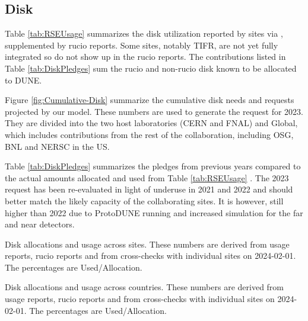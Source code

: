 \documentclass[12pt]{article}
\begin{document}
\subsection{Disk}
Table \ref{tab:RSEUsage} summarizes the disk utilization reported by sites via \cite{scotgrid}, supplemented by  rucio reports.   Some sites, notably TIFR, are not yet fully integrated so do not show up in the rucio reports.  The contributions listed in Table \ref{tab:DiskPledges} sum the rucio and non-rucio disk known to be allocated to DUNE.

Figure \ref{fig:Cumulative-Disk}  summarize the cumulative disk needs and requests projected by our model. These numbers are used to generate the request for 2023.  They are divided into the two host laboratories (CERN and FNAL) and Global, which includes contributions from the rest of the collaboration, including OSG, BNL and NERSC in the US. 

Table \ref{tab:DiskPledges} summarizes the pledges from previous years compared to the actual amounts allocated and used from Table \ref{tab:RSEUsage} .   The 2023 request has been re-evaluated in light of underuse in 2021 and 2022 and should better match the likely capacity of the collaborating sites.  It is however, still higher than 2022 due to ProtoDUNE running and increased simulation for the far and near detectors. 

\begin{sidewaystable}[ht]
\centering
{}
\caption{Disk allocations and usage across sites.    These numbers are derived from usage reports,  rucio reports and from cross-checks with individual sites on 2024-02-01.  The percentages are Used/Allocation. }
\label{tab:RSEUsage}
\end{sidewaystable}

\begin{table}[ht]
\centering
{}
\caption{Disk allocations and usage across countries.    These numbers are derived from usage reports,  rucio reports and from cross-checks with individual sites on 2024-02-01.  The percentages are Used/Allocation. }
\label{tab:GlobalUsage}
\end{table}
\end{document}
